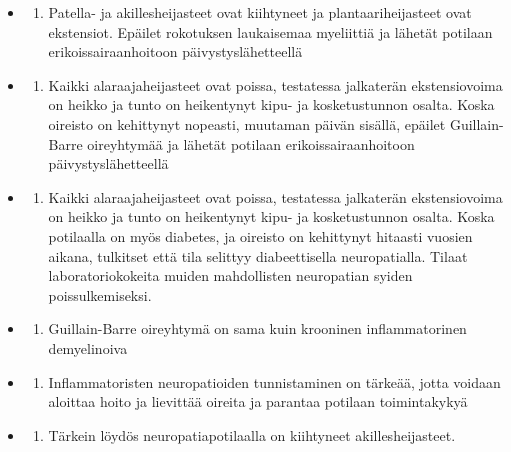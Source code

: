 \documentclass[
]{book}
\providecommand{\tightlist}{%
  \setlength{\itemsep}{0pt}\setlength{\parskip}{0pt}}
\begin{document}
\begin{itemize}
\tightlist
\item
  \begin{enumerate}
  \def\labelenumi{\alph{enumi}.}
  \tightlist
  \item
    Patella- ja akillesheijasteet ovat kiihtyneet ja plantaariheijasteet ovat ekstensiot. Epäilet rokotuksen laukaisemaa myeliittiä ja lähetät potilaan erikoissairaanhoitoon päivystyslähetteellä
  \end{enumerate}
\item
  \begin{enumerate}
  \def\labelenumi{\alph{enumi}.}
  \setcounter{enumi}{1}
  \tightlist
  \item
    Kaikki alaraajaheijasteet ovat poissa, testatessa jalkaterän ekstensiovoima on heikko ja tunto on heikentynyt kipu- ja kosketustunnon osalta. Koska oireisto on kehittynyt nopeasti, muutaman päivän sisällä, epäilet Guillain-Barre oireyhtymää ja lähetät potilaan erikoissairaanhoitoon päivystyslähetteellä
  \end{enumerate}
\item
  \begin{enumerate}
  \def\labelenumi{\alph{enumi}.}
  \setcounter{enumi}{2}
  \tightlist
  \item
    Kaikki alaraajaheijasteet ovat poissa, testatessa jalkaterän ekstensiovoima on heikko ja tunto on heikentynyt kipu- ja kosketustunnon osalta. Koska potilaalla on myös diabetes, ja oireisto on kehittynyt hitaasti vuosien aikana, tulkitset että tila selittyy diabeettisella neuropatialla. Tilaat laboratoriokokeita muiden mahdollisten neuropatian syiden poissulkemiseksi.
  \end{enumerate}
\item
  \begin{enumerate}
  \def\labelenumi{\alph{enumi}.}
  \setcounter{enumi}{3}
  \tightlist
  \item
    Guillain-Barre oireyhtymä on sama kuin krooninen inflammatorinen demyelinoiva
  \end{enumerate}
\item
  \begin{enumerate}
  \def\labelenumi{\alph{enumi}.}
  \setcounter{enumi}{4}
  \tightlist
  \item
    Inflammatoristen neuropatioiden tunnistaminen on tärkeää, jotta voidaan aloittaa hoito ja lievittää oireita ja parantaa potilaan toimintakykyä
  \end{enumerate}
\item
  \begin{enumerate}
  \def\labelenumi{\alph{enumi}.}
  \setcounter{enumi}{5}
  \tightlist
  \item
    Tärkein löydös neuropatiapotilaalla on kiihtyneet akillesheijasteet.
  \end{enumerate}
\end{itemize}
\end{document}
